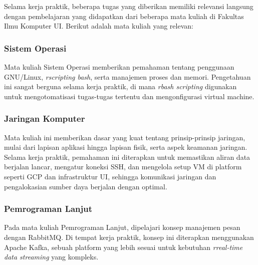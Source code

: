 Selama kerja praktik, beberapa tugas yang diberikan memiliki relevansi langsung dengan pembelajaran yang didapatkan dari beberapa mata kuliah di Fakultas Ilmu Komputer UI. Berikut adalah mata kuliah yang relevan:

\subsubsection{Sistem Operasi}
Mata kuliah Sistem Operasi memberikan pemahaman tentang penggunaan GNU/Linux, \textit{rscripting bash}, serta manajemen proses dan memori. Pengetahuan ini sangat berguna selama kerja praktik, di mana \textit{rbash scripting} digunakan untuk mengotomatisasi tugas-tugas tertentu dan mengonfigurasi virtual machine.

\subsubsection{Jaringan Komputer}
Mata kuliah ini memberikan dasar yang kuat tentang prinsip-prinsip jaringan, mulai dari lapisan aplikasi hingga lapisan fisik, serta aspek keamanan jaringan. Selama kerja praktik, pemahaman ini diterapkan untuk memastikan aliran data berjalan lancar, mengatur koneksi SSH, dan mengelola setup VM di platform seperti GCP dan infrastruktur UI, sehingga komunikasi jaringan dan pengalokasian sumber daya berjalan dengan optimal.

\subsubsection{Pemrograman Lanjut}
Pada mata kuliah Pemrograman Lanjut, dipelajari konsep manajemen pesan dengan RabbitMQ. Di tempat kerja praktik, konsep ini diterapkan menggunakan Apache Kafka, sebuah platform yang lebih sesuai untuk kebutuhan \textit{rreal-time data streaming} yang kompleks.
